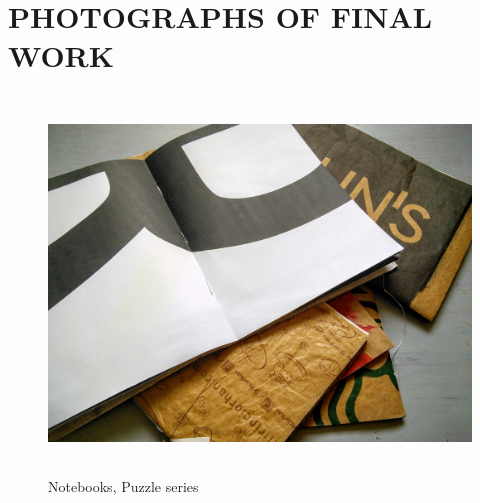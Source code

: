 \chapter{PHOTOGRAPHS OF FINAL WORK}

\begin{figure}[h!]
  \centering
  \includegraphics[height=10cm]{project_graphics/notebooks_puzzle_open.jpg}
  \caption{Notebooks, Puzzle series}
  \label{fig:CollectedAllTogether}
\end{figure}



